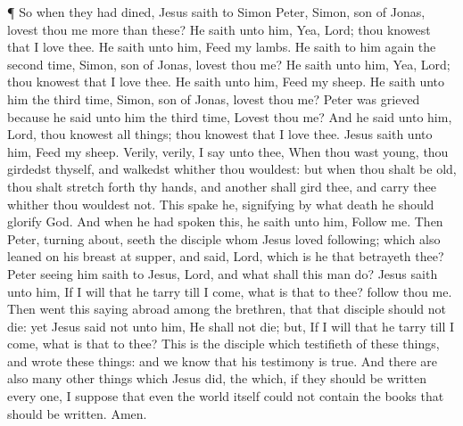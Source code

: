  ¶ So when they had dined, Jesus saith to Simon Peter,
Simon, son of Jonas, lovest thou me more than these? He saith unto him,
Yea, Lord; thou knowest that I love thee. He saith unto him, Feed my
lambs.  He saith to him again the second time, Simon, son
of Jonas, lovest thou me? He saith unto him, Yea, Lord; thou knowest
that I love thee. He saith unto him, Feed my sheep.  He
saith unto him the third time, Simon, son of Jonas, lovest thou me?
Peter was grieved because he said unto him the third time, Lovest thou
me? And he said unto him, Lord, thou knowest all things; thou knowest
that I love thee. Jesus saith unto him, Feed my sheep. 
Verily, verily, I say unto thee, When thou wast young, thou girdedst
thyself, and walkedst whither thou wouldest: but when thou shalt be old,
thou shalt stretch forth thy hands, and another shall gird thee, and
carry thee whither thou wouldest not.  This spake he,
signifying by what death he should glorify God. And when he had spoken
this, he saith unto him, Follow me.  Then Peter, turning
about, seeth the disciple whom Jesus loved following; which also leaned
on his breast at supper, and said, Lord, which is he that betrayeth
thee?  Peter seeing him saith to Jesus, Lord, and what
shall this man do?  Jesus saith unto him, If I will that he
tarry till I come, what is that to thee? follow thou me. 
Then went this saying abroad among the brethren, that that disciple
should not die: yet Jesus said not unto him, He shall not die; but, If I
will that he tarry till I come, what is that to thee?  This
is the disciple which testifieth of these things, and wrote these
things: and we know that his testimony is true.  And there
are also many other things which Jesus did, the which, if they should be
written every one, I suppose that even the world itself could not
contain the books that should be written. Amen.
